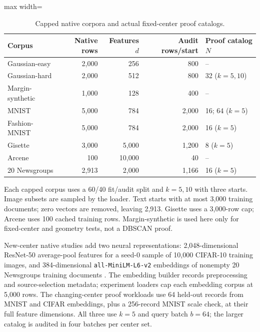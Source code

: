 \documentclass[5p,times,twocolumn]{elsarticle}
\theoremstyle{plain}
\theoremstyle{definition}
\theoremstyle{remark}
\begin{document}
\par\endgroup
\begingroup\color{RevisionGreen}
\begin{table}[tp]\color{RevisionGreen}
\caption{Capped native corpora and actual fixed-center proof catalogs.}\label{tab:datasets-a}
\centering\small
\begin{adjustbox}{max width=\textwidth}
\begin{tabular}{@{}lrrrl@{}}
\toprule
Corpus & Native rows & Features $d$ & Audit rows/start & Proof catalog $N$ \\
\midrule
Gaussian-easy & 2,000 & 256 & 800 & -- \\
Gaussian-hard & 2,000 & 512 & 800 & 32 ($k=5,10$) \\
Margin-synthetic & 1,000 & 128 & 400 & -- \\
MNIST & 5,000 & 784 & 2,000 & 16; 64 ($k=5$) \\
Fashion-MNIST & 5,000 & 784 & 2,000 & 16 ($k=5$) \\
Gisette & 3,000 & 5,000 & 1,200 & 8 ($k=5$) \\
Arcene & 100 & 10,000 & 40 & -- \\
20 Newsgroups & 2,913 & 2,000 & 1,166 & 16 ($k=5$) \\
\bottomrule
\end{tabular}
\end{adjustbox}
\par\vspace{3pt}\begin{minipage}{0.98\textwidth}\footnotesize Each capped corpus uses a 60/40 fit/audit split and $k=5,10$ with three starts. Image subsets are sampled by the loader. Text starts with at most 3,000 training documents; zero vectors are removed, leaving 2,913. Gisette uses a 3,000-row cap; Arcene uses 100 cached training rows. Margin-synthetic is used here only for fixed-center and geometry tests, not a DBSCAN proof.\end{minipage}
\end{table}


\par\endgroup


\begingroup\color{RevisionRed}
New-center native studies add two neural representations: 2,048-dimensional ResNet-50 average-pool features for a seed-0 sample of 10,000 CIFAR-10 training images, and 384-dimensional \texttt{all-MiniLM-L6-v2} embeddings of nonempty 20 Newsgroups training documents \cite{krizhevsky2009cifar,he2016resnet,reimers2019sbert,minilmv2model}. The embedding builder records preprocessing and source-selection metadata; experiment loaders cap each embedding corpus at 5,000 rows. The changing-center proof workloads use 64 held-out records from MNIST and CIFAR embeddings, plus a 256-record MNIST scale check, at their full feature dimensions. All three use $k=5$ and query batch $b=64$; the larger catalog is audited in four batches per center set.
\end{document}

